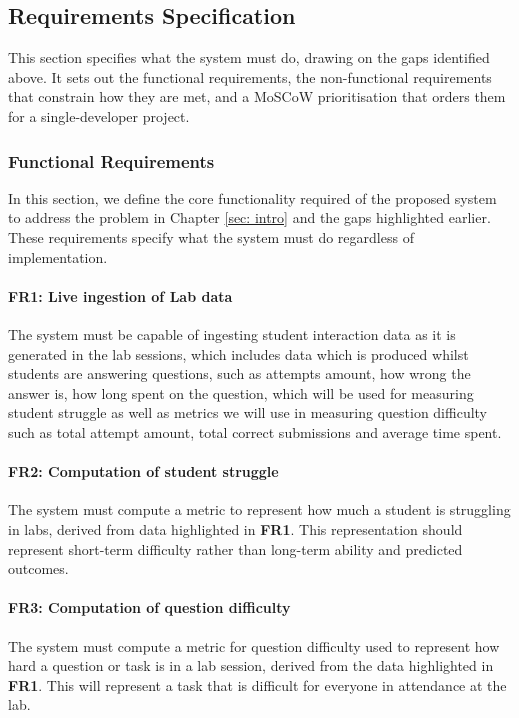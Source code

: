 \subsection{Requirements Specification}

This section specifies what the system must do, drawing on the gaps identified above. It sets out the functional requirements, the non-functional requirements that constrain how they are met, and a MoSCoW prioritisation that orders them for a single-developer project.

\subsubsection{Functional Requirements}
In this section, we define the core functionality required of the proposed system to address the problem in Chapter \ref{sec: intro} and the gaps highlighted earlier. These requirements specify what the system must do regardless of implementation.

\paragraph{FR1: Live ingestion of Lab data}
The system must be capable of ingesting student interaction data as it is generated in the lab sessions, which includes data which is produced whilst students are answering questions, such as attempts amount, how wrong the answer is, how long spent on the question, which will be used for measuring student struggle as well as metrics we will use in measuring question difficulty such as total attempt amount, total correct submissions and average time spent.

\paragraph{FR2: Computation of student struggle}
The system must compute a metric to represent how much a student is struggling in labs, derived from data highlighted in \textbf{FR1}. This representation should represent short-term difficulty rather than long-term ability and predicted outcomes.

\paragraph{FR3: Computation of  question difficulty}
The system must compute a metric for question difficulty used to represent how hard a question or task is in a lab session, derived from the data highlighted in \textbf{FR1}. This will represent a task that is difficult for everyone in attendance at the lab.

